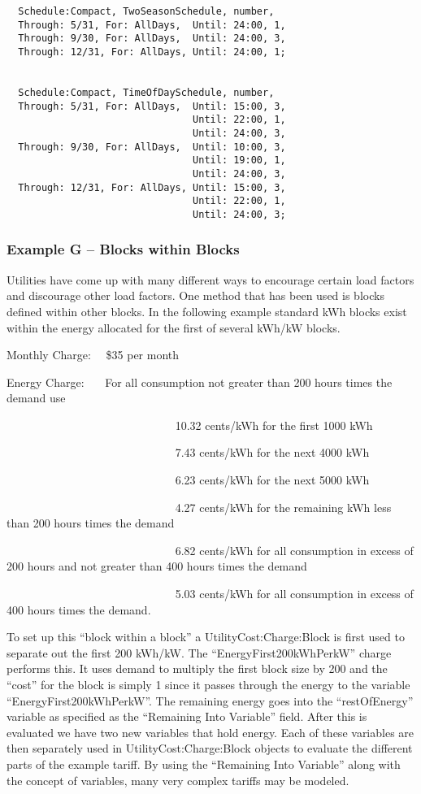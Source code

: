 \begin{lstlisting}
  Schedule:Compact, TwoSeasonSchedule, number,
  Through: 5/31, For: AllDays,  Until: 24:00, 1,
  Through: 9/30, For: AllDays,  Until: 24:00, 3,
  Through: 12/31, For: AllDays, Until: 24:00, 1;


  Schedule:Compact, TimeOfDaySchedule, number,
  Through: 5/31, For: AllDays,  Until: 15:00, 3,
                                Until: 22:00, 1,
                                Until: 24:00, 3,
  Through: 9/30, For: AllDays,  Until: 10:00, 3,
                                Until: 19:00, 1,
                                Until: 24:00, 3,
  Through: 12/31, For: AllDays, Until: 15:00, 3,
                                Until: 22:00, 1,
                                Until: 24:00, 3;
\end{lstlisting}

\subsubsection{Example G -- Blocks within Blocks}\label{example-g-blocks-within-blocks}

Utilities have come up with many different ways to encourage certain load factors and discourage other load factors. One method that has been used is blocks defined within other blocks. In the following example standard kWh blocks exist within the energy allocated for the first of several kWh/kW blocks.

Monthly Charge:~~ \$35 per month

Energy Charge:~~~ For all consumption not greater than 200 hours times the demand use

~~~~~~~~~~~~~~~~~~~~~~~~~~~~~ 10.32 cents/kWh for the first 1000 kWh

~~~~~~~~~~~~~~~~~~~~~~~~~~~~~ 7.43 cents/kWh for the next 4000 kWh

~~~~~~~~~~~~~~~~~~~~~~~~~~~~~ 6.23 cents/kWh for the next 5000 kWh

~~~~~~~~~~~~~~~~~~~~~~~~~~~~~ 4.27 cents/kWh for the remaining kWh less than 200 hours times the demand

~~~~~~~~~~~~~~~~~~~~~~~~~~~~~ 6.82 cents/kWh for all consumption in excess of 200 hours and not greater than 400 hours times the demand

~~~~~~~~~~~~~~~~~~~~~~~~~~~~~ 5.03 cents/kWh for all consumption in excess of 400 hours times the demand.

To set up this ``block within a block'' a UtilityCost:Charge:Block is first used to separate out the first 200 kWh/kW. The ``EnergyFirst200kWhPerkW'' charge performs this. It uses demand to multiply the first block size by 200 and the ``cost'' for the block is simply 1 since it passes through the energy to the variable ``EnergyFirst200kWhPerkW''. The remaining energy goes into the ``restOfEnergy'' variable as specified as the ``Remaining Into Variable'' field. After this is evaluated we have two new variables that hold energy. Each of these variables are then separately used in UtilityCost:Charge:Block objects to evaluate the different parts of the example tariff. By using the ``Remaining Into Variable'' along with the concept of variables, many very complex tariffs may be modeled.

